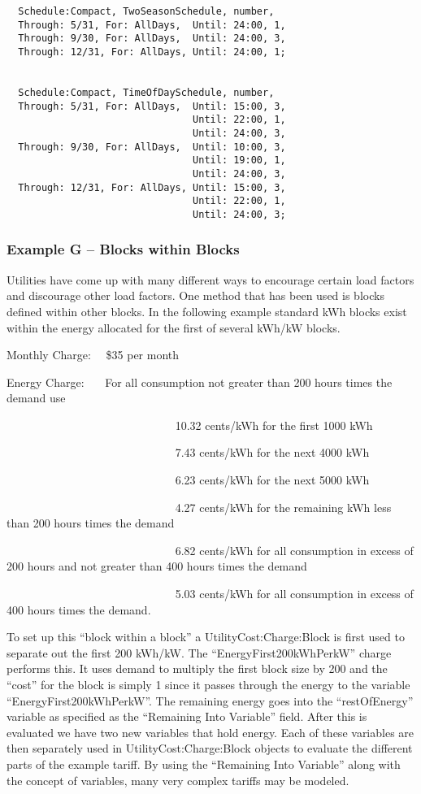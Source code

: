 \begin{lstlisting}
  Schedule:Compact, TwoSeasonSchedule, number,
  Through: 5/31, For: AllDays,  Until: 24:00, 1,
  Through: 9/30, For: AllDays,  Until: 24:00, 3,
  Through: 12/31, For: AllDays, Until: 24:00, 1;


  Schedule:Compact, TimeOfDaySchedule, number,
  Through: 5/31, For: AllDays,  Until: 15:00, 3,
                                Until: 22:00, 1,
                                Until: 24:00, 3,
  Through: 9/30, For: AllDays,  Until: 10:00, 3,
                                Until: 19:00, 1,
                                Until: 24:00, 3,
  Through: 12/31, For: AllDays, Until: 15:00, 3,
                                Until: 22:00, 1,
                                Until: 24:00, 3;
\end{lstlisting}

\subsubsection{Example G -- Blocks within Blocks}\label{example-g-blocks-within-blocks}

Utilities have come up with many different ways to encourage certain load factors and discourage other load factors. One method that has been used is blocks defined within other blocks. In the following example standard kWh blocks exist within the energy allocated for the first of several kWh/kW blocks.

Monthly Charge:~~ \$35 per month

Energy Charge:~~~ For all consumption not greater than 200 hours times the demand use

~~~~~~~~~~~~~~~~~~~~~~~~~~~~~ 10.32 cents/kWh for the first 1000 kWh

~~~~~~~~~~~~~~~~~~~~~~~~~~~~~ 7.43 cents/kWh for the next 4000 kWh

~~~~~~~~~~~~~~~~~~~~~~~~~~~~~ 6.23 cents/kWh for the next 5000 kWh

~~~~~~~~~~~~~~~~~~~~~~~~~~~~~ 4.27 cents/kWh for the remaining kWh less than 200 hours times the demand

~~~~~~~~~~~~~~~~~~~~~~~~~~~~~ 6.82 cents/kWh for all consumption in excess of 200 hours and not greater than 400 hours times the demand

~~~~~~~~~~~~~~~~~~~~~~~~~~~~~ 5.03 cents/kWh for all consumption in excess of 400 hours times the demand.

To set up this ``block within a block'' a UtilityCost:Charge:Block is first used to separate out the first 200 kWh/kW. The ``EnergyFirst200kWhPerkW'' charge performs this. It uses demand to multiply the first block size by 200 and the ``cost'' for the block is simply 1 since it passes through the energy to the variable ``EnergyFirst200kWhPerkW''. The remaining energy goes into the ``restOfEnergy'' variable as specified as the ``Remaining Into Variable'' field. After this is evaluated we have two new variables that hold energy. Each of these variables are then separately used in UtilityCost:Charge:Block objects to evaluate the different parts of the example tariff. By using the ``Remaining Into Variable'' along with the concept of variables, many very complex tariffs may be modeled.

